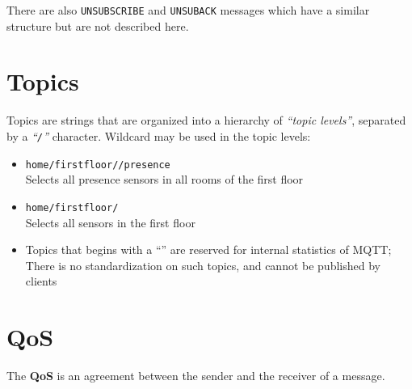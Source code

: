 
There are also \texttt{UNSUBSCRIBE} and \texttt{UNSUBACK} messages which have a similar structure but are not described here.

\section{Topics}
Topics are strings that are organized into a hierarchy
of \textit{``topic levels''}, separated by a \textit{``\texttt{/}''} character.
{\ns{}}
Wildcard may be used in the topic levels:
\begin{itemize}
   \item \texttt{home/firstfloor/\textred{+}/presence}\\
   Selects all presence sensors in all rooms of the first
   floor
   \item \texttt{home/firstfloor/\textred{\#}}\\
   Selects all sensors in the first floor
   \item Topics that begins with a ``\texttt{\textred{\$}}'' are reserved for internal statistics of MQTT;
   There is no standardization on such topics, and cannot be published by clients
\end{itemize}

\section{QoS}
The \textbf{QoS} is an agreement between the sender and the
receiver of a message.

